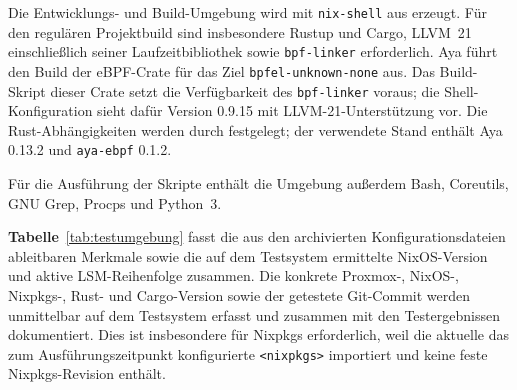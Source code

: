 Die Entwicklungs- und Build-Umgebung wird mit \texttt{nix-shell} aus
 erzeugt. Für den regulären Projektbuild sind insbesondere Rustup und
Cargo, LLVM~21 einschließlich seiner Laufzeitbibliothek sowie \texttt{bpf-linker} erforderlich.
Aya führt den Build der eBPF-Crate für das Ziel \texttt{bpfel-unknown-none} aus. Das Build-Skript dieser Crate setzt die Verfügbarkeit des
\texttt{bpf-linker} voraus; die Shell-Konfiguration sieht dafür Version 0.9.15 mit
LLVM-21-Unterstützung vor. Die Rust-Abhängigkeiten werden durch  festgelegt; der
verwendete Stand enthält Aya 0.13.2 und \texttt{aya-ebpf} 0.1.2.

Für die Ausführung der Skripte enthält die Umgebung außerdem Bash, Coreutils, GNU Grep, Procps und
Python~3.

\textbf{Tabelle}~\ref{tab:testumgebung} fasst die aus den archivierten Konfigurationsdateien ableitbaren
Merkmale sowie die auf dem Testsystem ermittelte NixOS-Version und aktive LSM-Reihenfolge
zusammen. Die konkrete Proxmox-, NixOS-, Nixpkgs-, Rust- und Cargo-Version sowie der
getestete Git-Commit werden unmittelbar auf dem Testsystem erfasst und zusammen mit den
Testergebnissen dokumentiert. Dies ist insbesondere für Nixpkgs erforderlich, weil die aktuelle
 das zum Ausführungszeitpunkt konfigurierte \texttt{<nixpkgs>}
importiert und keine feste Nixpkgs-Revision enthält.

